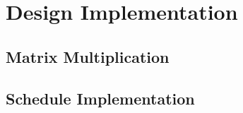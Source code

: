 

\chapter{Design Implementation}
\section{Matrix Multiplication}
\section{Schedule Implementation }

